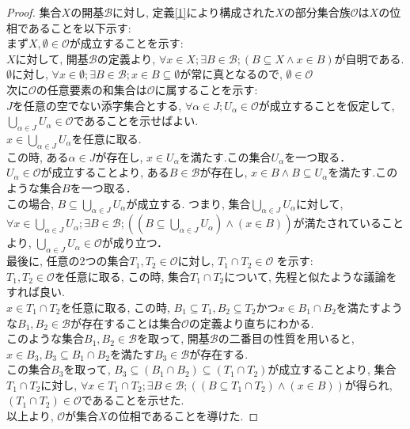 \documentclass[lualatex]{ltjsbook}
\theoremstyle{remark}
\theoremstyle{plain}
\begin{document}
\begin{proof}
	集合$X$の開基$\mathcal{B}$に対し,  定義\ref{1}により構成された$X$の部分集合族$\mathcal{O}$は$X$の位相であることを以下示す:\\
	まず$X,  \emptyset \in \mathcal{O} $が成立することを示す:\\
	$ X$に対して,  開基$\mathcal{B}$の定義より,  $\forall x \in X  ; \exists B \in \mathcal{B} ; \left( B  \subseteq X \land x \in B \right)$が自明である.\\
	$\emptyset $に対し,  $\forall x \in \emptyset ; \exists B \in \mathcal{B} ; x \in B \subseteq \emptyset$が常に真となるので,  $\emptyset \in \mathcal{O}$\\
	次に$\mathcal{O}$の任意要素の和集合は$\mathcal{O}$に属することを示す:\\
	$J$を任意の空でない添字集合とする,  $\forall \alpha \in J; U_{\alpha} \in \mathcal{O}$が成立することを仮定して,  $\bigcup\limits_{\alpha \in J} U_{\alpha } \in \mathcal{O}$であることを示せばよい.\\
	$x \in \bigcup\limits_{\alpha \in J} U_{\alpha }$を任意に取る.\\
	この時,  ある$\alpha \in J$が存在し,  $x \in U_{\alpha}$を満たす.この集合$U_{\alpha}$を一つ取る．\\
	$U_{\alpha } \in \mathcal{O}$が成立することより,  ある$B \in \mathcal{B}$が存在し,  $x \in B \land B \subseteq U_{\alpha}$を満たす.このような集合$B$を一つ取る．\\
	この場合,  $B \subseteq \bigcup\limits_{\alpha \in J} U_{\alpha } $が成立する.
	つまり,  集合$\bigcup\limits_{\alpha \in J} U_{\alpha } $に対して,  $\forall x \in \bigcup\limits_{\alpha \in J} U_{\alpha } ; \exists B \in \mathcal{B} ; \left( \left( B  \subseteq \bigcup\limits_{\alpha \in J} U_{\alpha } \right)  \land \left( x \in B \right) \right) $が満たされていることより,  
	$\bigcup\limits_{\alpha \in J} U_{\alpha } \in \mathcal{O}$が成り立つ．\\
	最後に, 任意の2つの集合$T_1 ,  T_2 \in \mathcal{O}$に対し,  $T_1 \cap T_2 \in \mathcal{O}$ を示す:\\
	$T_1 ,  T_2 \in \mathcal{O}$を任意に取る,  この時,  集合$T_1 \cap T_2$について,  先程と似たような議論をすれば良い.\\
	$x \in T_1 \cap T_2 $を任意に取る,  この時,  $B_1 \subseteq T_1,  B_2 \subseteq T_2$かつ$x \in B_1 \cap B_2$を満たすような$B_1, B_2 \in \mathcal{B}$が存在することは集合$\mathcal{O}$の定義より直ちにわかる.\\
	このような集合$B_1,  B_2 \in \mathcal{B}$を取って, 開基$\mathcal{B}$の二番目の性質を用いると,  $x \in B_3 , B_3 \subseteq B_1 \cap B_2 $を満たす$B_3 \in \mathcal{B}$が存在する.\\
	この集合$B_3$を取って,  $B_3 \subseteq \left( B_1 \cap B_2  \right) \subseteq \left( T_1 \cap T_2 \right) $が成立することより,  集合$T_1 \cap T_2 $に対し,  $\forall x \in T_1 \cap T_2 ; \exists B \in \mathcal{B} ; \left( \left( B  \subseteq T_1  \cap T_2 \right) \land \left( x \in B \right) \right) $が得られ,  $\left( T_1 \cap T_2 \right) \in \mathcal{O}$であることを示せた.\\
	以上より,  $\mathcal{O}$が集合$X$の位相であることを導けた.
\end{proof}
\end{document}
